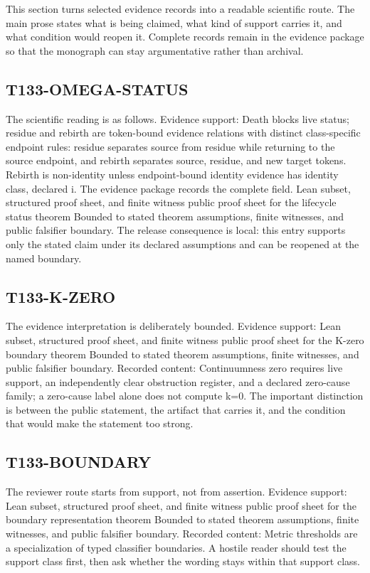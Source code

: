 This section turns selected evidence records into a readable scientific route. The main prose states what is being claimed, what kind of support carries it, and what condition would reopen it. Complete records remain in the evidence package so that the monograph can stay argumentative rather than archival.

\subsection{T133-OMEGA-STATUS}
The scientific reading is as follows. Evidence support: Death blocks live status; residue and rebirth are token-bound evidence relations with distinct class-specific endpoint rules: residue separates source from residue while returning to the source endpoint, and rebirth separates source, residue, and new target tokens. Rebirth is non-identity unless endpoint-bound identity evidence has identity class, declared i. The evidence package records the complete field. Lean subset, structured proof sheet, and finite witness public proof sheet for the lifecycle status theorem Bounded to stated theorem assumptions, finite witnesses, and public falsifier boundary. The release consequence is local: this entry supports only the stated claim under its declared assumptions and can be reopened at the named boundary.

\subsection{T133-K-ZERO}
The evidence interpretation is deliberately bounded. Evidence support: Lean subset, structured proof sheet, and finite witness public proof sheet for the K-zero boundary theorem Bounded to stated theorem assumptions, finite witnesses, and public falsifier boundary. Recorded content: Continuumness zero requires live support, an independently clear obstruction register, and a declared zero-cause family; a zero-cause label alone does not compute k=0. The important distinction is between the public statement, the artifact that carries it, and the condition that would make the statement too strong.

\subsection{T133-BOUNDARY}
The reviewer route starts from support, not from assertion. Evidence support: Lean subset, structured proof sheet, and finite witness public proof sheet for the boundary representation theorem Bounded to stated theorem assumptions, finite witnesses, and public falsifier boundary. Recorded content: Metric thresholds are a specialization of typed classifier boundaries. A hostile reader should test the support class first, then ask whether the wording stays within that support class.

